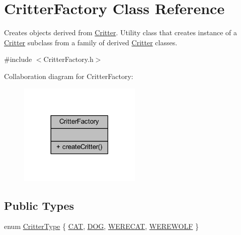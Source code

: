 \hypertarget{class_critter_factory}{\section{Critter\+Factory Class Reference}
\label{class_critter_factory}
}


Creates objects derived from \hyperlink{class_critter}{Critter}. Utility class that creates instance of a \hyperlink{class_critter}{Critter} subclass from a family of derived \hyperlink{class_critter}{Critter} classes.  




{\ttfamily \#include $<$Critter\+Factory.\+h$>$}



Collaboration diagram for Critter\+Factory\+:
\nopagebreak
\begin{figure}[H]
\begin{center}
\leavevmode
\includegraphics[width=165pt]{class_critter_factory__coll__graph}
\end{center}
\end{figure}
\subsection*{Public Types}
\begin{DoxyCompactItemize}
\item 
enum \hyperlink{class_critter_factory_a865a154e14b99d3dbf4d329a49210f6a}{Critter\+Type} \{ \hyperlink{class_critter_factory_a865a154e14b99d3dbf4d329a49210f6aaac2fdd0d6df8da9a2c6e984d010655c5}{C\+A\+T}, 
\hyperlink{class_critter_factory_a865a154e14b99d3dbf4d329a49210f6aaeecb28f72cdc5acb898c5a8256b05f29}{D\+O\+G}, 
\hyperlink{class_critter_factory_a865a154e14b99d3dbf4d329a49210f6aabb786a2c290b737c46c7be72df575d57}{W\+E\+R\+E\+C\+A\+T}, 
\hyperlink{class_critter_factory_a865a154e14b99d3dbf4d329a49210f6aa47578594f1bc7d73797a2a7fb0750aaf}{W\+E\+R\+E\+W\+O\+L\+F}
 \}
\end{DoxyCompactItemize}
